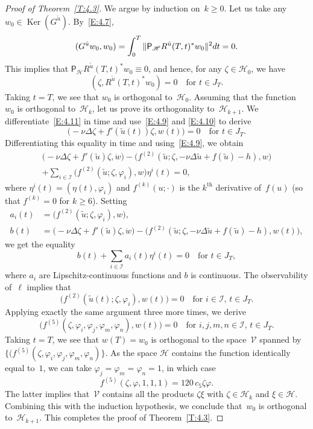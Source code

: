 \documentclass[11pt]{article}
\theoremstyle{plain}
\theoremstyle{definition}
\let\mathcal\mathscr
\theoremstyle{plain}
\numberwithin{equation}{section}
\newcommand{\dd}{{\textup d}}
\DeclareMathOperator{\Ker}{Ker}
\newcommand{\HH}{{\mathcal H}}
\newcommand{\II}{{\mathcal I}}
\newcommand{\VV}{{\mathcal V}}
\begin{document}
\begin{proof}[Proof of Theorem~\ref{T:4.3}]
We argue by induction on~$k \ge 0$. Let us take any $w_0\in \Ker(G^{\tilde u})$. By~\eqref{E:4.7},
\[
(G^{\tilde u}w_0,w_0)=\int_0^T\|{\mathsf P}_\HH R^{\tilde u}(T,t)^*w_0\|^2\dd t=0.
\]
This implies that ${\mathsf P}_\HH R^{\tilde u}(T,t)^*w_0\equiv0$, and hence, for any $\zeta\in\HH_0$, we have
\begin{equation} \label{E:4.11}
(\zeta,R^{\tilde u}(T,t)^*w_0)=0\quad \text{for $t\in J_T$}.
\end{equation}
Taking $t=T$, we see that $w_0$ is orthogonal to~$\HH_0$. Assuming that the function~$w_0$ is orthogonal to~$\HH_k$, let us prove its orthogonality to~$\HH_{k+1}$. We differentiate~\eqref{E:4.11} in time and use~\eqref{E:4.9} and \eqref{E:4.10} to derive
\[
\bigl(-\nu\Delta \zeta+f'(\tilde u(t))\zeta,w(t)\bigr)=0\quad\text{for $t\in J_T$}.
\]
Differentiating this equality in time and using~\eqref{E:4.9}, we obtain\vspace*{-3pt}
\begin{multline*}
\bigl(-\nu\Delta\zeta+f'(\tilde u)\zeta,\dot w\bigr)-\bigl(f^{(2)}(\tilde u;\zeta,-\nu\Delta\tilde u+f(\tilde u)-h),w\bigr)\\
+\sum_{i\in\II}\bigl(f^{(2)}(\tilde u;\zeta,\varphi_i),w\bigr)\eta^i(t)=0,
\end{multline*}
where $\eta^i(t)=(\eta(t),\varphi_i)$ and $f^{(k)}(u;\cdot)$ is the $k^\text{th}$ derivative of~$f(u)$ (so that $f^{(k)}=0$ for $k\ge6$). Setting\vspace*{-3pt}
\begin{align*}
a_i(t)&=\bigl(f^{(2)}(\tilde u;\zeta,\varphi_i),w\bigr),\\
b(t)&= \bigl(-\nu\Delta\zeta+f'(\tilde u)\zeta,\dot w\bigr)-\bigl(f^{(2)}(\tilde u;\zeta,-\nu\Delta\tilde u+f(\tilde u)-h),w(t)\bigr),
\end{align*} we get the equality\vspace*{-3pt}
\[
b(t)+\sum_{i\in\II}a_i(t)\eta^i(t)=0\quad\text{for $t\in J_T$},
\] where $a_i$
are Lipschitz-continuous functions and $b$ is continuous. The observability of~$\ell$ implies that\vspace*{-3pt}
\begin{equation*}
\bigl(f^{(2)}(\tilde u(t);\zeta,\varphi_i),w(t)\bigr)=0
\quad\text{for $i\in\II$, $t\in J_T$}.
\end{equation*}
Applying exactly the same argument three more times, we derive\vspace*{-3pt}
\[
\bigl(f^{(5)}(\zeta,\varphi_i,\varphi_j,\varphi_m,\varphi_n),w(t)\bigr)=0
\quad\text{for $i,j,m,n\in\II$, $t\in J_T$}.
\]
Taking $t=T$, we see that $w(T)=w_0$ is orthogonal to the space~$\VV$ spanned by~$\{(f^{(5)}(\zeta,\varphi_i,\varphi_j,\varphi_m,\varphi_n)\}$. As the space $\HH$ contains the function identically equal to~$1$, we can take $\varphi_j=\varphi_m=\varphi_n=1$, in which case\vspace*{-3pt}
\[
f^{(5)}(\zeta,\varphi,1,1,1)=120\,c_5 \zeta\varphi.
\]
The latter implies that~$\VV$ contains all the products $\zeta\xi$ with $\zeta\in\HH_k$ and $\xi\in\HH$. Combining this with the induction hypothesis, we conclude that~$w_0$ is orthogonal to~$\HH_{k+1}$. This completes the proof of Theorem~\ref{T:4.3}.
\end{proof}
\end{document}
